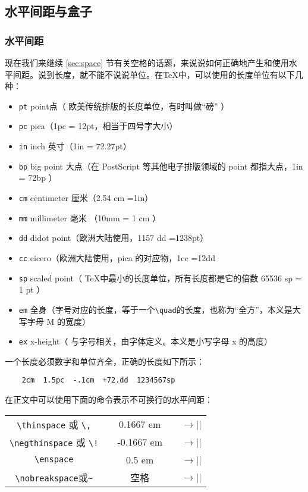 \subsection{水平间距与盒子}

\subsubsection{水平间距}

现在我们来继续 \ref{sec:space} 节有关空格的话题，来说说如何正确地产生和使用水平间距。说到长度，就不能不说说单位。在\TeX 中，可以使用的长度单位有以下几种：
\begin{itemize}
    \item \verb|pt| \qquad point点（ 欧美传统排版的长度单位，有时叫做“磅” ）
    \item \verb|pc| \qquad pica（1pc = 12pt，相当于四号字大小）
    \item \verb|in| \qquad inch 英寸（1in = 72.27pt）
    \item \verb|bp| \qquad big point 大点（在 PostScript 等其他电子排版领域的 point 都指大点，1in = 72bp ）
    \item \verb|cm| \qquad centimeter 厘米（2.54 cm =1in）
    \item \verb|mm| \qquad millimeter 毫米 （10mm = 1 cm ）
    \item \verb|dd| \qquad didot point（欧洲大陆使用，1157 dd =1238pt）
    \item \verb|cc| \qquad cicero（欧洲大陆使用，pica 的对应物，1cc =12dd
    \item \verb|sp| \qquad scaled point（ \TeX 中最小的长度单位，所有长度都是它的倍数 65536 sp = 1 pt ）
    \item \verb|em| \qquad 全身（字号对应的长度，等于一个\verb|\quad|的长度，也称为“全方”，本义是大写字母 M 的宽度）
    \item \verb|ex| \qquad x-height（ 与字号相关，由字体定义。本义是小写字母 x 的高度）
\end{itemize}

一个长度必须数字和单位齐全，正确的长度如下所示：
\begin{lstlisting}
    2cm  1.5pc  -.1cm  +72.dd  1234567sp
\end{lstlisting}

在正文中可以使用下面的命令表示不可换行的水平间距：
\begin{table}[H]
    \centering
    \begin{tabular}{ccccc}
    \verb|\thinspace| 或 \verb|\,| && 0.1667 em && $\longrightarrow$\negthinspace|\thinspace| \\
    \verb|\negthinspace| 或 \verb|\!| && -0.1667 em && $\longrightarrow$\negthinspace|\negthinspace\negthinspace| \\
    \verb|\enspace|  && 0.5 em && $\longrightarrow$\negthinspace|\enspace| \\
    \verb|\nobreakspace|或\verb|~|  &&  空格 && $\longrightarrow$\negthinspace|\nobreakspace| \\
    \end{tabular}
\end{table}

